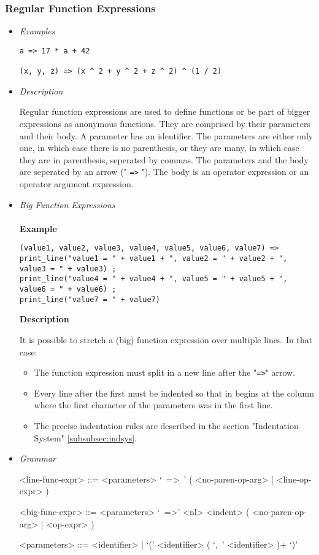 \documentclass{article}
\begin{document}
\subsubsection{Regular Function Expressions}

\begin{itemize}
\item \textit{Examples}

\begin{verbatim}
a => 17 * a + 42

(x, y, z) => (x ^ 2 + y ^ 2 + z ^ 2) ^ (1 / 2)
\end{verbatim}

\item \textit{Description}

Regular function expressions are used to define functions or be part of bigger
expressions as anonymous functions. They are comprised by their parameters and
their body. A parameter has an identifier. The parameters are either
only one, in which case there is no parenthesis, or they are many, in which
case they are in parenthesis, seperated by commas. The parameters and the body
are seperated by an arrow (" \texttt{=>} "). The body is an operator
expression or an operator argument expression.

\item \textit{Big Function Expressions}\\\\
\textbf{Example}

\begin{verbatim}
(value1, value2, value3, value4, value5, value6, value7) => 
print_line("value1 = " + value1 + ", value2 = " + value2 + ", value3 = " + value3) ;
print_line("value4 = " + value4 + ", value5 = " + value5 + ", value6 = " + value6) ;
print_line("value7 = " + value7)
\end{verbatim}

\textbf{Description}

It is possible to stretch a (big) function expression over multiple lines.
In that case:
\begin{itemize}
\item
The function expression must split in a new line after the "\texttt{=>}" arrow.

\item
Every line after the first must be indented so that in begins at the column 
where the first character of the parameters was in the first line.

\item
The precise indentation rules are described in the section
"Indentation System" \ref{subsubsec:indsys}.
\end{itemize}

\item \textit{Grammar}
\begin{grammar}
<line-func-expr> ::=
<parameters> `\ =>\ ' ( <no-paren-op-arg> | <line-op-expr> )

<big-func-expr> ::=
<parameters> `\ =>' <nl> <indent> ( <no-paren-op-arg> | <op-expr> )

<parameters> ::= <identifier> | `(' <identifier> ( `,\ ' <identifier> )+ `)'
\end{grammar}
\end{itemize}
\end{document}
